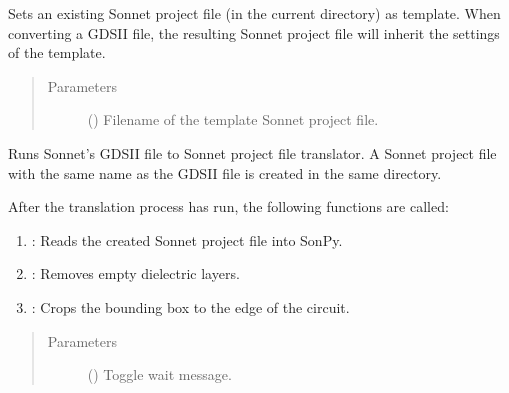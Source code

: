 \documentclass[letterpaper,10pt,english,openany]{sphinxmanual}
\begin{document}
\begin{fulllineitems}
\begin{fulllineitems}
\label{\detokenize{source/sonpy:sonpy.sonnet.setTemplateFile}}
Sets an existing Sonnet project file (in the current directory) as template. When converting a GDSII file, the resulting Sonnet project file will inherit the settings of the template.
\begin{quote}\begin{description}
\item[{Parameters}] \leavevmode
{} () \textendash{} Filename of the template Sonnet project file.

\end{description}\end{quote}

\end{fulllineitems}


\begin{fulllineitems}
\label{\detokenize{source/sonpy:sonpy.sonnet.runGdsTranslator}}
Runs Sonnet’s GDSII file to Sonnet project file translator. A Sonnet project file with the same name as the GDSII file is created in the same directory.

After the translation process has run, the following functions are called:
\begin{enumerate}
\item {} 
{\hyperref[\detokenize{source/sonpy:sonpy.sonnet.readProject}]{}}: Reads the created Sonnet project file into SonPy.

\item {} 
{\hyperref[\detokenize{source/sonpy:sonpy.sonnet.collapseDlayers}]{}}: Removes empty dielectric layers.

\item {} 
{\hyperref[\detokenize{source/sonpy:sonpy.sonnet.cropBox}]{}}: Crops the bounding box to the edge of the circuit.

\end{enumerate}
\begin{quote}\begin{description}
\item[{Parameters}] \leavevmode
{} () \textendash{} Toggle wait message.


\end{description}
\end{quote}
\end{fulllineitems}
\end{fulllineitems}
\end{document}

